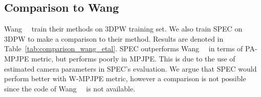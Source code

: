 \documentclass[10pt,twocolumn,letterpaper,usenames,dvipsnames]{article}
\begin{document}
\begin{table}
    \centering
    \caption{Ablation experiments on \methodname with 3DPW validation set. : using the image center as camera center;  and : using \camcalib estimated focal length and camera rotation, respectively. All numbers are in \emph{mm}.}
    \label{tab:hmr_3dpw}
\end{table}

\begin{table}
    \centering
    \caption{Comparison to Wang~\etal~\cite{wang2020viewpoint}. Here both methods are trained with 3DPW training set for a fair comparison.}
    \label{tab:comparison_wang_etal}
\end{table}

\subsection{Comparison to Wang \etal~\cite{wang2020viewpoint}}
Wang~\etal~\cite{wang2020viewpoint} train their methods on 3DPW training set. We also train SPEC on 3DPW to make a comparison to their method. Results are denoted in Table~\ref{tab:comparison_wang_etal}. SPEC outperforms Wang~\etal~\cite{wang2020viewpoint} in terms of PA-MPJPE metric, but performs poorly in MPJPE. This is due to the use of estimated camera parameters in SPEC's evaluation. We argue that SPEC would perform better with W-MPJPE metric, however a comparison is not possible since the code of Wang~\etal~\cite{wang2020viewpoint} is not available.
\end{document}
